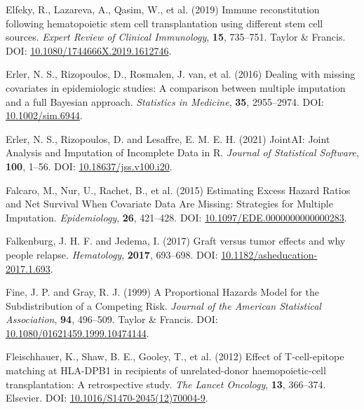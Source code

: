 \documentclass[
  letterpaper,
  DIV=11,
  numbers=noendperiod]{scrreprt}
\newlength{\cslhangindent}
\newlength{\cslentryspacingunit} %
\newenvironment{CSLReferences}[2] %
 {%
  \setlength{\parindent}{0pt}
  \ifodd #1
  \let\oldpar\par
  \def\par{\hangindent=\cslhangindent\oldpar}
  \fi
  \setlength{\parskip}{#2\cslentryspacingunit}
 }%
 {}
\begin{document}
\begin{CSLReferences}{1}{0}
\leavevmode{}%
Elfeky, R., Lazareva, A., Qasim, W., et al. (2019) Immune reconstitution
following hematopoietic stem cell transplantation using different stem
cell sources. \emph{Expert Review of Clinical Immunology}, \textbf{15},
735--751. Taylor \& Francis. DOI:
\href{https://doi.org/10.1080/1744666X.2019.1612746}{10.1080/1744666X.2019.1612746}.

\leavevmode{}%
Erler, N. S., Rizopoulos, D., Rosmalen, J. van, et al. (2016) Dealing
with missing covariates in epidemiologic studies: A comparison between
multiple imputation and a full {Bayesian} approach. \emph{Statistics in
Medicine}, \textbf{35}, 2955--2974. DOI:
\href{https://doi.org/10.1002/sim.6944}{10.1002/sim.6944}.

\leavevmode{}%
Erler, N. S., Rizopoulos, D. and Lesaffre, E. M. E. H. (2021) {JointAI}:
{Joint Analysis} and {Imputation} of {Incomplete Data} in {R}.
\emph{Journal of Statistical Software}, \textbf{100}, 1--56. DOI:
\href{https://doi.org/10.18637/jss.v100.i20}{10.18637/jss.v100.i20}.

\leavevmode{}%
Falcaro, M., Nur, U., Rachet, B., et al. (2015) Estimating {Excess
Hazard Ratios} and {Net Survival When Covariate Data Are Missing}:
{Strategies} for {Multiple Imputation}. \emph{Epidemiology},
\textbf{26}, 421--428. DOI:
\href{https://doi.org/10.1097/EDE.0000000000000283}{10.1097/EDE.0000000000000283}.

\leavevmode{}%
Falkenburg, J. H. F. and Jedema, I. (2017) Graft versus tumor effects
and why people relapse. \emph{Hematology}, \textbf{2017}, 693--698. DOI:
\href{https://doi.org/10.1182/asheducation-2017.1.693}{10.1182/asheducation-2017.1.693}.

\leavevmode{}%
Fine, J. P. and Gray, R. J. (1999) A {Proportional Hazards Model} for
the {Subdistribution} of a {Competing Risk}. \emph{Journal of the
American Statistical Association}, \textbf{94}, 496--509. Taylor \&
Francis. DOI:
\href{https://doi.org/10.1080/01621459.1999.10474144}{10.1080/01621459.1999.10474144}.

\leavevmode{}%
Fleischhauer, K., Shaw, B. E., Gooley, T., et al. (2012) Effect of
{T-cell-epitope} matching at {HLA-DPB1} in recipients of unrelated-donor
haemopoietic-cell transplantation: A retrospective study. \emph{The
Lancet Oncology}, \textbf{13}, 366--374. Elsevier. DOI:
\href{https://doi.org/10.1016/S1470-2045(12)70004-9}{10.1016/S1470-2045(12)70004-9}.


\end{CSLReferences}
\end{document}
